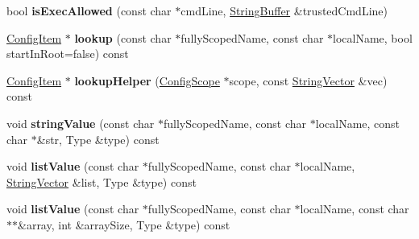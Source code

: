 \begin{DoxyCompactItemize}
\item 
\hypertarget{classCONFIG4CPP__NAMESPACE_1_1ConfigurationImpl_a88b26a86ce783d24451484bb9d478262}{bool {\bfseries is\-Exec\-Allowed} (const char $\ast$cmd\-Line, \hyperlink{classCONFIG4CPP__NAMESPACE_1_1StringBuffer}{String\-Buffer} \&trusted\-Cmd\-Line)}\label{classCONFIG4CPP__NAMESPACE_1_1ConfigurationImpl_a88b26a86ce783d24451484bb9d478262}

\item 
\hypertarget{classCONFIG4CPP__NAMESPACE_1_1ConfigurationImpl_aae2099c70a6b6e07b07927a60d53dedc}{\hyperlink{classCONFIG4CPP__NAMESPACE_1_1ConfigItem}{Config\-Item} $\ast$ {\bfseries lookup} (const char $\ast$fully\-Scoped\-Name, const char $\ast$local\-Name, bool start\-In\-Root=false) const }\label{classCONFIG4CPP__NAMESPACE_1_1ConfigurationImpl_aae2099c70a6b6e07b07927a60d53dedc}

\item 
\hypertarget{classCONFIG4CPP__NAMESPACE_1_1ConfigurationImpl_aa6ca2f56d32f3074720879eb49af3545}{\hyperlink{classCONFIG4CPP__NAMESPACE_1_1ConfigItem}{Config\-Item} $\ast$ {\bfseries lookup\-Helper} (\hyperlink{classCONFIG4CPP__NAMESPACE_1_1ConfigScope}{Config\-Scope} $\ast$scope, const \hyperlink{classCONFIG4CPP__NAMESPACE_1_1StringVector}{String\-Vector} \&vec) const }\label{classCONFIG4CPP__NAMESPACE_1_1ConfigurationImpl_aa6ca2f56d32f3074720879eb49af3545}

\item 
\hypertarget{classCONFIG4CPP__NAMESPACE_1_1ConfigurationImpl_a5f66dda4a99712ed8d5f846b0fa3bd02}{void {\bfseries string\-Value} (const char $\ast$fully\-Scoped\-Name, const char $\ast$local\-Name, const char $\ast$\&str, Type \&type) const }\label{classCONFIG4CPP__NAMESPACE_1_1ConfigurationImpl_a5f66dda4a99712ed8d5f846b0fa3bd02}

\item 
\hypertarget{classCONFIG4CPP__NAMESPACE_1_1ConfigurationImpl_aca1b9bec78f8fb8a716eca2b7711127c}{void {\bfseries list\-Value} (const char $\ast$fully\-Scoped\-Name, const char $\ast$local\-Name, \hyperlink{classCONFIG4CPP__NAMESPACE_1_1StringVector}{String\-Vector} \&list, Type \&type) const }\label{classCONFIG4CPP__NAMESPACE_1_1ConfigurationImpl_aca1b9bec78f8fb8a716eca2b7711127c}

\item 
\hypertarget{classCONFIG4CPP__NAMESPACE_1_1ConfigurationImpl_a5665bf32691780545806590e151f06b9}{void {\bfseries list\-Value} (const char $\ast$fully\-Scoped\-Name, const char $\ast$local\-Name, const char $\ast$$\ast$\&array, int \&array\-Size, Type \&type) const }\label{classCONFIG4CPP__NAMESPACE_1_1ConfigurationImpl_a5665bf32691780545806590e151f06b9}


\end{DoxyCompactItemize}
